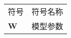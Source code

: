 \begin{center}
    \begin{longtable}{@{}l l@{}}
        符号 & 符号名称  \\
        $\mathbf{W}$ & 模型参数 \\
    \end{longtable}
\end{center}